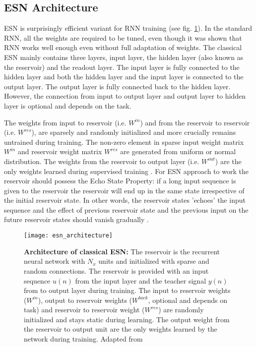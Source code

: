 \subsection{ESN Architecture}

ESN is surprisingly efficient variant for RNN training (see fig. \ref{fig:esn_arch}). In the standard RNN, all the weights are required to be tuned, even though it was shown that RNN works well enough even without full adaptation of weights. The classical ESN mainly contains three layers, input layer, the hidden layer (also known as the reservoir) and the readout layer. The input layer is fully connected to the hidden layer and both the hidden layer and the input layer is connected to the output layer. The output layer is fully connected back to the hidden layer. However, the connection from input to output layer and output layer to hidden layer is optional and depends on the task.

The weights from input to reservoir (i.e. $W^{in}$) and from the reservoir to reservoir (i.e. $W^{res}$), are sparsely and randomly initialized and more crucially remains untrained during training. The non-zero element in sparse input weight matrix $W^{in}$ and reservoir weight matrix $W^{res}$ are generated from uniform or normal distribution. The weights from the reservoir to output layer (i.e. $W^{out}$) are the only weights learned during supervised training \cite{esn:jaeger:2001, esn:practical_guide}. For ESN approach to work the reservoir should possess the Echo State Property: if a long input sequence is given to the reservoir the reservoir will end up in the same state irrespective of the initial reservoir state. In other words, the reservoir states 'echoes' the input sequence and the effect of previous reservoir state and the previous input on the future reservoir states should vanish gradually \cite{esn:practical_guide, esn:jaeger_tutorial}. 

\begin{figure}[hbtp]
\centering
\texttt{[image: esn\_architecture]}
\caption[Architecture of classical ESN]{\textbf{Architecture of classical ESN:} The reservoir is the recurrent neural network with $N_{x}$ units and initialized with sparse and random connections. The reservoir is provided with an input sequence $u(n)$ from the input layer and the teacher signal $y(n)$ from to output layer during training. The input to reservoir weights ($W^{in}$), output to reservoir weights ($W^{back}$, optional and depends on task) and reservoir to reservoir weight ($W^{res}$) are randomly initialized and stays static during learning. The output weight from the reservoir to output unit are the only weights learned by the network during training. Adapted from \cite{esn:practical_guide}}
\label{fig:esn_arch}
\end{figure}

